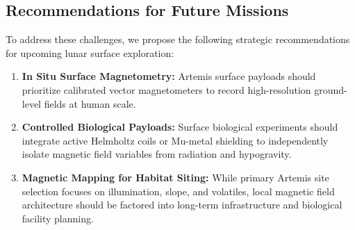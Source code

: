 \subsection{Recommendations for Future Missions}
To address these challenges, we propose the following strategic recommendations for upcoming lunar surface exploration:
\begin{enumerate}
    \item \textbf{In Situ Surface Magnetometry:} Artemis surface payloads should prioritize calibrated vector magnetometers to record high-resolution ground-level fields at human scale.
    \item \textbf{Controlled Biological Payloads:} Surface biological experiments should integrate active Helmholtz coils or Mu-metal shielding to independently isolate magnetic field variables from radiation and hypogravity.
    \item \textbf{Magnetic Mapping for Habitat Siting:} While primary Artemis site selection focuses on illumination, slope, and volatiles, local magnetic field architecture should be factored into long-term infrastructure and biological facility planning.
\end{enumerate}
